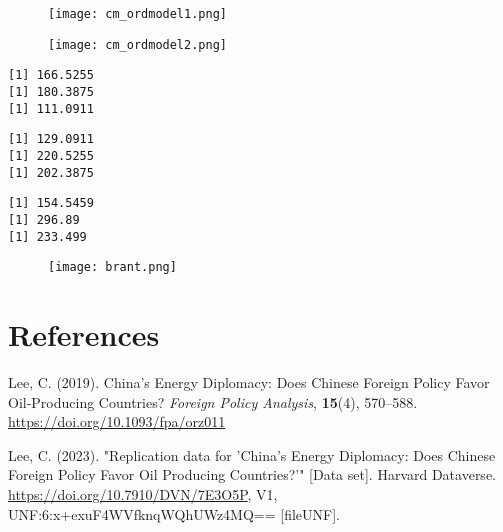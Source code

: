 \documentclass[12pt,letterpaper]{article}
\begin{document}
\newpage
 

\begin{figure}[H]
    \centering
    \texttt{[image: cm\_ordmodel1.png]}
\end{figure}

\begin{figure}[H]
    \centering
    \texttt{[image: cm\_ordmodel2.png]}
\end{figure}

 
\begin{verbatim}
[1] 166.5255
[1] 180.3875
[1] 111.0911
\end{verbatim}

 
\begin{verbatim}
[1] 129.0911
[1] 220.5255
[1] 202.3875
\end{verbatim}

 
\begin{verbatim}
[1] 154.5459
[1] 296.89
[1] 233.499
\end{verbatim}

 

\begin{figure}[H]
    \centering
    \texttt{[image: brant.png]}
\end{figure}

\newpage
\section{References}

\noindent Lee, C. (2019). China’s Energy Diplomacy: Does Chinese Foreign Policy Favor Oil-Producing Countries? \textit{Foreign Policy Analysis}, \textbf{15}(4), 570–588. \url{https://doi.org/10.1093/fpa/orz011} \\

\vspace{0.25cm}

\noindent Lee, C. (2023). "Replication data for 'China's Energy Diplomacy: Does Chinese Foreign Policy Favor Oil Producing Countries?'" [Data set]. Harvard Dataverse. \url{https://doi.org/10.7910/DVN/7E3O5P}, V1, UNF:6:x+exuF4WVfknqWQhUWz4MQ== [fileUNF].
\end{document}
